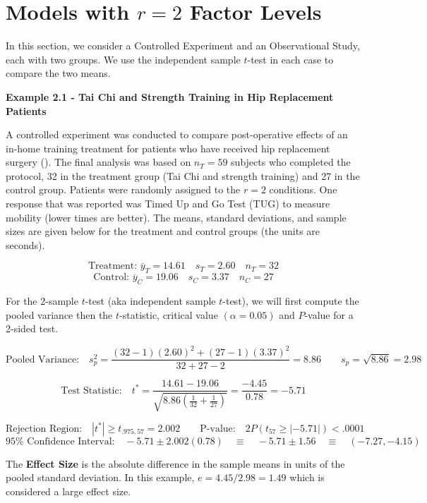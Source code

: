 \documentclass[
]{book}
\begin{document}
\section{\texorpdfstring{Models with \(r=2\) Factor
Levels}{Models with r=2 Factor Levels}}\label{models-with-r2-factor-levels}

In this section, we consider a Controlled Experiment and an
Observational Study, each with two groups. We use the independent sample
\(t\)-test in each case to compare the two means.

\textbf{Example 2.1 - Tai Chi and Strength Training in Hip Replacement
Patients}

A controlled experiment was conducted to compare post-operative effects
of an in-home training treatment for patients who have received hip
replacement surgery (). The
final analysis was based on \(n_T=59\) subjects who completed the
protocol, 32 in the treatment group (Tai Chi and strength training) and
27 in the control group. Patients were randomly assigned to the \(r=2\)
conditions. One response that was reported was Timed Up and Go Test
(TUG) to measure mobility (lower times are better). The means, standard
deviations, and sample sizes are given below for the treatment and
control groups (the units are seconds).

\[ \mbox{Treatment: } \overline{y}_T=14.61 \quad s_T= 2.60 \quad n_T=32 \]
\[ \mbox{Control: } \overline{y}_C=19.06 \quad s_C=3.37 \quad n_C=27 \]

For the 2-sample \(t\)-test (aka independent sample \(t\)-test), we will
first compute the pooled variance then the \(t\)-statistic, critical
value \((\alpha=0.05)\) and \(P\)-value for a 2-sided test.

\[ \mbox{Pooled Variance:} \quad s_p^2 = \frac{(32-1)(2.60)^2+(27-1)(3.37)^2}{32+27-2}
= 8.86  \qquad s_p=\sqrt{8.86}=2.98\]

\[
\mbox{Test Statistic:} \quad t^* = \frac{14.61-19.06}{\sqrt{8.86\left(\frac{1}{32}+\frac{1}{27}\right)}}
=\frac{-4.45}{0.78}=-5.71 
\]

\[
\mbox{Rejection Region:} \quad |t^*| \geq t_{.975,57}=2.002  \qquad
\mbox{P-value:} \quad 2P\left(t_{57}\geq |-5.71|\right)<.0001 
\] \[
95\% \mbox{ Confidence Interval:} \quad -5.71 \pm 2.002(0.78) \quad \equiv \quad
-5.71 \pm 1.56 \quad \equiv \quad (-7.27,-4.15)
\]

The \textbf{Effect Size} is the absolute difference in the sample means
in units of the pooled standard deviation. In this example,
\(e=4.45/2.98=1.49\) which is considered a large effect size.
\end{document}
